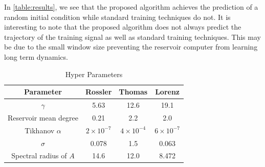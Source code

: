 \documentclass[journal]{journal}
\begin{document}
In \ref{table:results}, we see that the proposed algorithm achieves the prediction of a random initial condition while standard training techniques do not. It is interesting to note that the proposed algorithm does not always predict the trajectory of the training signal as well as standard training techniques. This may be due to the small window size preventing the reservoir computer from learning long term dynamics.

\begin{table}
\caption{Hyper Parameters}
\begin{tabular}{c | c c c }
Parameter & Rossler & Thomas & Lorenz \\
\hline
$\gamma$ & 5.63 & 12.6 & 19.1 \\
Reservoir mean degree & 0.21 & 2.2 & 2.0 \\
Tikhanov $\alpha$ & $2 \times 10^{-7}$ & $4 \times 10^{-4}$  & $6 \times 10^{-7}$ \\
$\sigma$ & 0.078 & 1.5 & 0.063 \\
Spectral radius of $A$ & 14.6 & 12.0 & 8.472 
\end{tabular}
\end{table}
%
%

\end{document}
